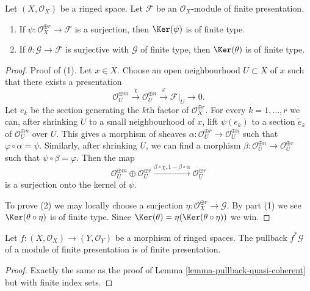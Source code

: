 \begin{lemma}
\label{lemma-kernel-surjection-finite-free-onto-finite-presentation}
Let $(X, \mathcal{O}_X)$ be a ringed space.
Let $\mathcal{F}$ be an $\mathcal{O}_X$-module of finite presentation.
\begin{enumerate}
\item If $\psi : \mathcal{O}_X^{\oplus r} \to \mathcal{F}$ is a surjection,
then $\Ker(\psi)$ is of finite type.
\item If $\theta : \mathcal{G} \to \mathcal{F}$ is surjective with
$\mathcal{G}$ of finite type, then $\Ker(\theta)$ is of finite type.
\end{enumerate}
\end{lemma}

\begin{proof}
Proof of (1).
Let $x \in X$. Choose an open neighbourhood $U \subset X$ of $x$
such that there exists a presentation
$$
\mathcal{O}_U^{\oplus m}
\xrightarrow{\chi}
\mathcal{O}_U^{\oplus n}
\xrightarrow{\varphi}
\mathcal{F}|_U
\to
0.
$$
Let $e_k$ be the section generating the $k$th factor of
$\mathcal{O}_X^{\oplus r}$. For every $k = 1, \ldots, r$
we can, after shrinking $U$ to a small neighbourhood of $x$,
lift $\psi(e_k)$ to a section $\tilde e_k$ of
$\mathcal{O}_U^{\oplus n}$ over $U$. This gives a morphism
of sheaves $\alpha : \mathcal{O}_U^{\oplus r} \to \mathcal{O}_U^{\oplus n}$
such that $\varphi \circ \alpha = \psi$.
Similarly, after shrinking $U$, we can find a morphism
$\beta : \mathcal{O}_U^{\oplus n} \to \mathcal{O}_U^{\oplus r}$
such that $\psi \circ \beta = \varphi$. Then the map
$$
\mathcal{O}_U^{\oplus m} \oplus
\mathcal{O}_U^{\oplus r}
\xrightarrow{\beta \circ \chi, 1 - \beta \circ \alpha}
\mathcal{O}_U^{\oplus r}
$$
is a surjection onto the kernel of $\psi$.

\medskip\noindent
To prove (2) we may locally choose a surjection
$\eta : \mathcal{O}_X^{\oplus r} \to \mathcal{G}$.
By part (1) we see $\Ker(\theta \circ \eta)$ is of finite type.
Since $\Ker(\theta) = \eta(\Ker(\theta \circ \eta))$ we win.
\end{proof}

\begin{lemma}
\label{lemma-pullback-finite-presentation}
Let $f : (X, \mathcal{O}_X) \to (Y, \mathcal{O}_Y)$
be a morphism of ringed spaces.
The pullback $f^*\mathcal{G}$ of a module of finite presentation
is of finite presentation.
\end{lemma}

\begin{proof}
Exactly the same as the proof of Lemma \ref{lemma-pullback-quasi-coherent}
but with finite index sets.
\end{proof}

